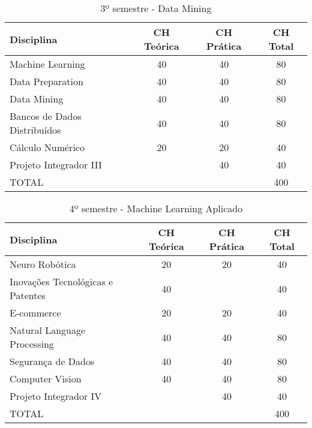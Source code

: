 \documentclass[a4paper, 12pt, openright, oneside, german, french, english, brazil]{abntex2}
\begin{document}
\begin{table}[!h]
  \centering
  \footnotesize
  \caption{3º semestre - Data Mining}
  \label{3sem}
  \begin{tabular}{|p{6cm}|c|c|c|}
    \hline
    \textbf{Disciplina} & CH Teórica & CH Prática & CH Total \\
    \hline
    Machine Learning & 40 & 40 & 80 \\
    \hline
    Data Preparation & 40 & 40 & 80 \\
    \hline
    Data Mining & 40 & 40 & 80 \\
    \hline
    Bancos de Dados Distribuídos & 40 & 40 & 80 \\
    \hline
    Cálculo Numérico & 20 & 20 & 40 \\
    \hline
    Projeto Integrador III & & 40 & 40 \\
    \hline
    TOTAL & & & 400 \\
    \hline
  \end{tabular}
\end{table}


\begin{table}[!h]
  \centering
  \footnotesize
  \caption{4º semestre - Machine Learning Aplicado}
  \label{4sem}
  \begin{tabular}{|p{6cm}|c|c|c|}
    \hline
    \textbf{Disciplina} & CH Teórica & CH Prática & CH Total \\
    \hline
    Neuro Robótica & 20 & 20 & 40 \\
    \hline
    Inovações Tecnológicas e Patentes & 40 & & 40 \\
    \hline
    E-commerce & 20 & 20 & 40 \\
    \hline
    Natural Language Processing & 40 & 40 & 80 \\
    \hline
    Segurança de Dados & 40 & 40 & 80 \\
    \hline
    Computer Vision & 40 & 40 & 80 \\
    \hline
    Projeto Integrador IV & & 40 & 40 \\
    \hline
    TOTAL & & & 400 \\
    \hline
  \end{tabular}
\end{table}
\end{document}
